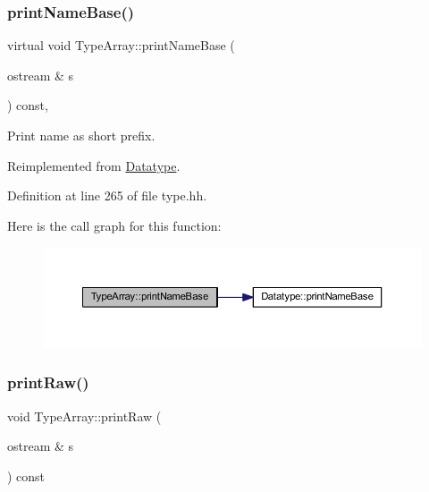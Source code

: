 \subsubsection{\texorpdfstring{printNameBase()}{printNameBase()}}
{\footnotesize\ttfamily virtual void Type\+Array\+::print\+Name\+Base (\begin{DoxyParamCaption}\item[{ostream \&}]{s }\end{DoxyParamCaption}) const\hspace{0.3cm}{\ttfamily [inline]}, {\ttfamily [virtual]}}



Print name as short prefix. 



Reimplemented from \mbox{\hyperlink{class_datatype_aec50467c2d81d22daf052a95e283a24a}{Datatype}}.



Definition at line 265 of file type.\+hh.

Here is the call graph for this function\+:
\nopagebreak
\begin{figure}[H]
\begin{center}
\leavevmode
\includegraphics[width=350pt]{class_type_array_aa3c9c83ca86e94bb58772d9933d88617_cgraph}
\end{center}
\end{figure}
\mbox{\label{class_type_array_a16a9d1e80de3beda0a101b7942dc1f77}} 
\subsubsection{\texorpdfstring{printRaw()}{printRaw()}}
{\footnotesize\ttfamily void Type\+Array\+::print\+Raw (\begin{DoxyParamCaption}\item[{ostream \&}]{s }\end{DoxyParamCaption}) const\hspace{0.3cm}{\ttfamily [virtual]}}



